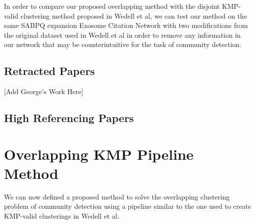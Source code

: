 \documentclass{article}
\begin{document}
In order to compare our proposed overlapping method with the disjoint KMP-valid clustering method proposed in Wedell et al, we can test our method on the same SABPQ expansion Exosome Citation Network with two modifications from the original dataset used in Wedell et al in order to remove any information in our network that may be counterintuitive for the task of community detection. 

\subsection{Retracted Papers}

[Add George's Work Here]

\subsection{High Referencing Papers}

\section{Overlapping KMP Pipeline Method}

We can now defined a proposed method to solve the overlapping clustering problem of community detection using a pipeline similar to the one used to create KMP-valid clusterings in Wedell et al. 
\end{document}
